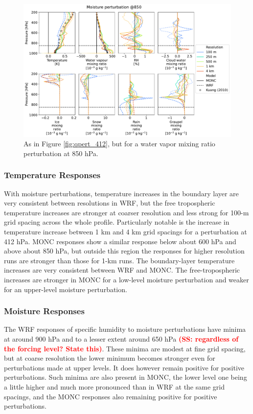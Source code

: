 \documentclass[draft]{agujournal2019}
\newcommand{\todo}[1]{\textcolor{red}{\textbf{(#1)}}}
\begin{document}
\begin{figure}[pth]
    \noindent\includegraphics[width=\textwidth]{figures/pert_diffs_q_0.0002_@850}
    \caption{As in Figure \ref{fig:qpert_412}, but for a water vapor mixing
    ratio perturbation at 850 hPa.}
    \label{fig:qpert_850}
\end{figure}

\subsubsection{Temperature Responses}

With moisture perturbations, temperature increases in the boundary layer are
very consistent between resolutions in WRF, but the free tropospheric
temperature increases are stronger at coarser resolution and less strong for
100-m grid spacing across the whole profile. Particularly notable is the
increase in temperature increase between 1 km and 4 km grid spacings for a
perturbation at 412 hPa. MONC responses show a similar response below about 600
hPa and above about 850 hPa, but outside this region the responses for higher
resolution runs are stronger than those for 1-km runs. The boundary-layer
temperature increases are very consistent between WRF and MONC. The
free-tropospheric increases are stronger in MONC for a low-level moisture
perturbation and weaker for an upper-level moisture perturbation.

\subsubsection{Moisture Responses}

The WRF responses of specific humidity to moisture perturbations have minima at
around 900 hPa and to a lesser extent around 650 hPa \todo{SS: regardless of the
forcing level?  State this}. These minima are modest at fine grid spacing, but
at coarse resolution the lower minimum becomes stronger even for perturbations
made at upper levels. It does however remain positive for positive
perturbations. Such minima are also present in MONC, the lower level one being a
little higher and much more pronounced than in WRF at the same grid spacings,
and the MONC responses also remaining positive for positive perturbations.
\end{document}
